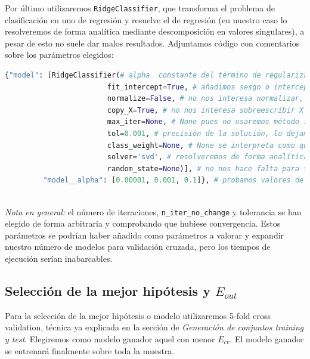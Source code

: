 \documentclass[11pt,a4paper]{article}
\theoremstyle{definition}
\begin{document}
	Por último utilizaremos \texttt{RidgeClassifier}, que transforma el problema de clasificación en uno de regresión y resuelve el de regresión (en nuestro caso lo resolveremos de forma analítica mediante descomposición en valores singulares), a pesar de esto no suele dar malos resultados. Adjuntamos código con comentarios sobre los parámetros elegidos:
	\begin{lstlisting}[language=Python, caption= Par\'ametros usados en \texttt{RidgeClassifier}, inputencoding=latin1]
  {"model": [RidgeClassifier(# alpha  constante del término de regularización (probaremos distintos valores mediante 5-fold cross validation)
                        fit_intercept=True, # añadimos sesgo o intercept pues nuestra matriz aún no tiene columna de 1s 
                        normalize=False, # no nos interesa normalizar, ya lo hicimos en preprocesado
                        copy_X=True, # no nos interesa sobreescribir X
                        max_iter=None, # None pues no usaremos método iterativo
                        tol=0.001, # precisión de la solución, lo dejamos por defecto, no nos importa pues utilizaremos solución analítica por SVD
                        class_weight=None, # None se interpreta como que todas las clases tienen peso 1, que es el caso
                        solver='svd', # resolveremos de forma analítica usando descomposición en valores singulares 
                        random_state=None)], # no nos hace falta para tener reproducibilidad de los resultados pues no se va a usar solver=sag o solver=saga. Obtendremos solución analítica
         "model__alpha": [0.00001, 0.001, 0.1]}, # probamos valores de regularización arbitrarios dentro de los recomendados
	\end{lstlisting}~\\
	
	\textit{Nota en general:} el número de iteraciones, \texttt{n\_iter\_no\_change} y tolerancia se han elegido de forma arbitraria y comprobando que hubiese convergencia. Estos parámetros se podrían haber añadido como parámetros a valorar y expandir nuestro número de modelos para validación cruzada, pero los tiempos de ejecución serían inabarcables.
	
	\subsection{Selección de la mejor hipótesis y $E_{out}$}
	Para la selección de la mejor hipótesis o modelo utilizaremos 5-fold cross validation, técnica ya explicada en la sección de \textit{Generación de conjuntos training y test}. Elegiremos como modelo ganador aquel con menor $E_{cv}$. El modelo ganador se entrenará finalmente sobre toda la muestra.
	
\end{document}
